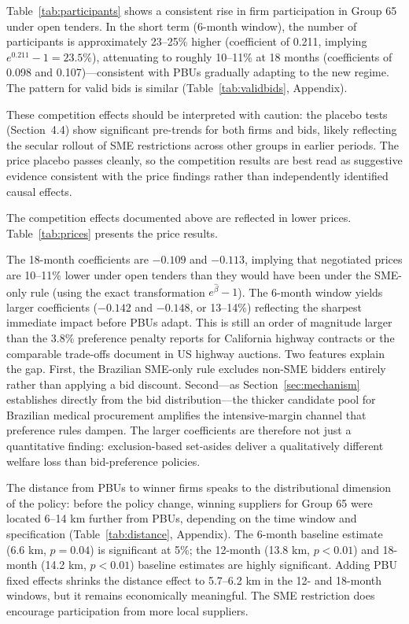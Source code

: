 Table~\ref{tab:participants} shows a consistent rise in firm participation in Group 65 under open tenders. In the short term (6-month window), the number of participants is approximately 23--25\% higher (coefficient of 0.211, implying $e^{0.211}-1 = 23.5\%$), attenuating to roughly 10--11\% at 18 months (coefficients of 0.098 and 0.107)---consistent with PBUs gradually adapting to the new regime. The pattern for valid bids is similar (Table~\ref{tab:validbids}, Appendix).

These competition effects should be interpreted with caution: the placebo tests (Section~4.4) show significant pre-trends for both firms and bids, likely reflecting the secular rollout of SME restrictions across other groups in earlier periods. The price placebo passes cleanly, so the competition results are best read as suggestive evidence consistent with the price findings rather than independently identified causal effects.

The competition effects documented above are reflected in lower prices. Table~\ref{tab:prices} presents the price results.



The 18-month coefficients are $-0.109$ and $-0.113$, implying that negotiated prices are 10--11\% lower under open tenders than they would have been under the SME-only rule (using the exact transformation $e^{\hat{\beta}}-1$). The 6-month window yields larger coefficients ($-0.142$ and $-0.148$, or 13--14\%) reflecting the sharpest immediate impact before PBUs adapt. This is still an order of magnitude larger than the 3.8\% preference penalty \citet{marion2007} reports for California highway contracts or the comparable trade-offs \citet{krasnokutskaya2011} document in US highway auctions. Two features explain the gap. First, the Brazilian SME-only rule excludes non-SME bidders entirely rather than applying a bid discount. Second---as Section~\ref{sec:mechanism} establishes directly from the bid distribution---the thicker candidate pool for Brazilian medical procurement amplifies the intensive-margin channel that preference rules dampen. The larger coefficients are therefore not just a quantitative finding: exclusion-based set-asides deliver a qualitatively different welfare loss than bid-preference policies.

The distance from PBUs to winner firms speaks to the distributional dimension of the policy: before the policy change, winning suppliers for Group 65 were located 6--14 km further from PBUs, depending on the time window and specification (Table~\ref{tab:distance}, Appendix). The 6-month baseline estimate (6.6 km, $p = 0.04$) is significant at 5\%; the 12-month (13.8 km, $p < 0.01$) and 18-month (14.2 km, $p < 0.01$) baseline estimates are highly significant. Adding PBU fixed effects shrinks the distance effect to 5.7--6.2 km in the 12- and 18-month windows, but it remains economically meaningful. The SME restriction does encourage participation from more local suppliers.

